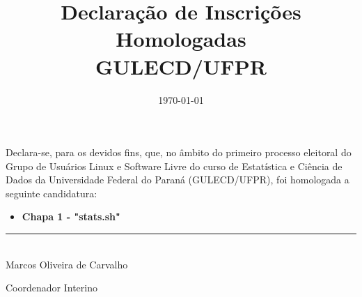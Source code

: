 \documentclass[11pt,a4paper]{article}
\title{\textbf{Declaração de Inscrições Homologadas \\ GULECD/UFPR}}
\author{}
\date{\today}
\begin{document}
\maketitle

Declara-se, para os devidos fins, que, no âmbito do primeiro processo eleitoral
do Grupo de Usuários Linux e Software Livre do curso de Estatística e Ciência de
Dados da Universidade Federal do Paraná (GULECD/UFPR), foi homologada a seguinte
candidatura:

\begin{itemize}
    \item \textbf{Chapa 1 - "stats.sh"}
\end{itemize}

\vspace{3cm}

\begin{center}
    \rule{8cm}{0.4pt}\\
    Marcos Oliveira de Carvalho
    
    Coordenador Interino
\end{center}
\end{document}

